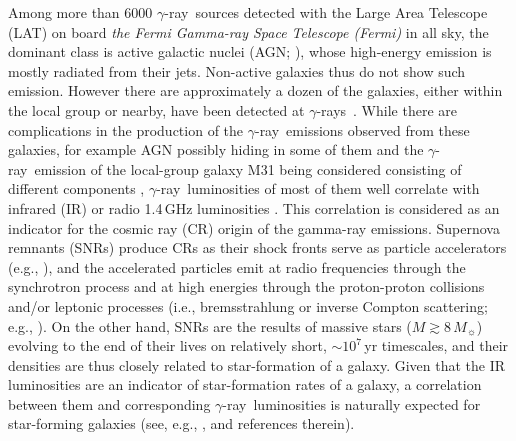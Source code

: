 \documentclass[twocolumn]{aastex631}
\newcommand{\gr}{$\gamma$-ray}
\newcommand{\grs}{$\gamma$-rays}
\begin{document}
Among more than 6000 \gr\ sources detected with the Large Area Telescope (LAT)
on board {\it the Fermi Gamma-ray Space Telescope (Fermi)} in all sky, the 
dominant class is active galactic nuclei (AGN; \citealt{4fgl-dr3}), whose 
high-energy emission is mostly radiated from their jets. Non-active galaxies 
thus do not show such emission. However there are approximately a dozen of 
the galaxies, either 
within the local group or
nearby, have been detected at \grs\ \citep{aje+20,xi+20}. While there are 
complications in the
production of the \gr\ emissions observed from these galaxies, for example 
AGN possibly hiding in some of them \citep{pen+19} and the \gr\ emission of
the local-group galaxy M31 being considered consisting of different 
components \citep{li+16,pvp16,ack+17,kmc19,zim+22,xin+23},
\gr\ luminosities of most of them 
well correlate with infrared (IR) or radio 1.4\,GHz luminosities 
\citep{abd+10,ack+12,aje+20,xi+20}.
This correlation is considered as an indicator for the cosmic ray (CR) origin
of the gamma-ray emissions. Supernova remnants (SNRs) produce CRs as their 
shock fronts serve as particle accelerators (e.g., \citealt{byk+18}), and the 
accelerated
particles emit at radio frequencies through the synchrotron process and
at high energies through the proton-proton collisions and/or 
leptonic processes (i.e., bremsstrahlung or inverse Compton scattering;
e.g., \citealt{der86}). On the other hand, SNRs are the results of massive 
stars ($M\gtrsim 8\,M_{\sun}$) evolving to the end of their lives on
relatively short, $\sim 10^7$\,yr timescales, and their densities are 
thus closely related to star-formation of a galaxy.
Given that the IR luminosities are an indicator of star-formation rates
of a galaxy, a correlation between them and corresponding \gr\ luminosities is 
naturally expected
for star-forming galaxies (see, e.g., \citealt{dt05,ltq10,ack+12}, and 
references therein).
\end{document}
